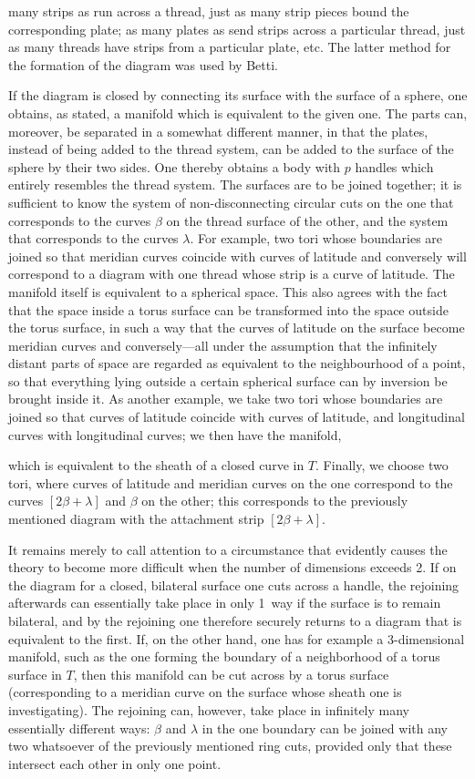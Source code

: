 \documentclass{article}
\begin{document}
many strips as run across a thread, just as many strip pieces bound the corresponding plate; as many plates as send strips across a particular thread, just as many threads have strips from a particular plate, etc. The latter method for the formation of the diagram was used by Betti.

If the diagram is closed by connecting its surface with the surface of a sphere, one obtains, as stated, a manifold which is equivalent to the given one. The parts can, moreover, be separated in a somewhat different manner, in that the plates, instead of being added to the thread system, can be added to the surface of the sphere by their two sides. One thereby obtains a body with $p$ handles which entirely resembles the thread system. The surfaces are to be joined together; it is sufficient to know the system of non-disconnecting circular cuts on the one that corresponds to the curves $\beta$ on the thread surface of the other, and the system that corresponds to the curves $\lambda$. For example, two tori whose boundaries are joined so that meridian curves coincide with curves of latitude and conversely will correspond to a diagram with one thread whose strip is a curve of latitude. The manifold itself is equivalent to a spherical space. This also agrees with the fact that the space inside a torus surface can be transformed into the space outside the torus surface, in such a way that the curves of latitude on the surface become meridian curves and conversely---all under the assumption that the infinitely distant parts of space are regarded as equivalent to the neighbourhood of a point, so that everything lying outside a certain spherical surface can by inversion be brought inside it. As another example, we take two tori whose boundaries are joined so that curves of latitude coincide with curves of latitude, and longitudinal curves with longitudinal curves; we then have the manifold,

which is equivalent to the sheath of a closed curve in $T$. Finally, we choose two tori, where curves of latitude and meridian curves on the one correspond to the curves $[2\beta + \lambda]$ and $\beta$ on the other; this corresponds to the previously mentioned diagram with the attachment strip $[2\beta + \lambda]$.

It remains merely to call attention to a circumstance that evidently causes the theory to become more difficult when the number of dimensions exceeds 2. If on the diagram for a closed, bilateral surface one cuts across a handle, the rejoining afterwards can essentially take place in only 1~way if the surface is to remain bilateral, and by the rejoining one therefore securely returns to a diagram that is equivalent to the first. If, on the other hand, one has for example a 3-dimensional manifold, such as the one forming the boundary of a neighborhood of a torus surface in $T$, then this manifold can be cut across by a torus surface (corresponding to a meridian curve on the surface whose sheath one is investigating). The rejoining can, however, take place in infinitely many essentially different ways: $\beta$ and $\lambda$ in the one boundary can be joined with any two whatsoever of the previously mentioned ring cuts, provided only that these intersect each other in only one point.
\end{document}
